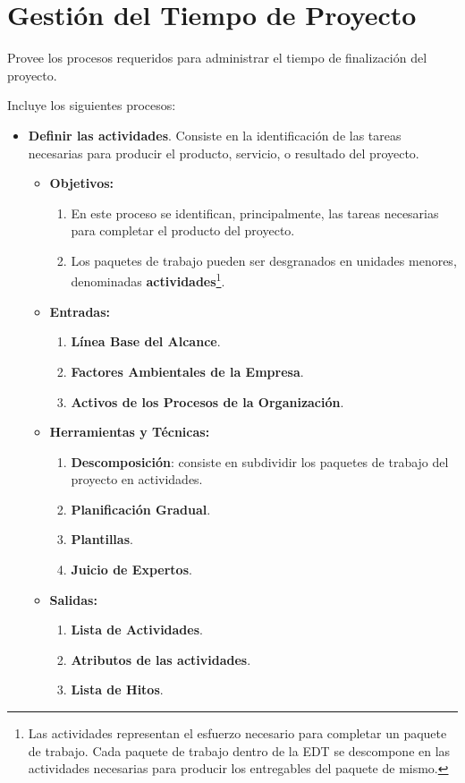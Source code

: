 \documentclass[10pt,a4paper]{article}
\begin{document}
\section{Gestión del Tiempo de Proyecto}
Provee los procesos requeridos para administrar el tiempo de finalización del proyecto.

Incluye los siguientes procesos:
\begin{itemize}
\item \textbf{Definir las actividades}. 
Consiste en la identificación de las tareas necesarias para producir el producto, servicio, o resultado del proyecto.

\begin{itemize}
\item \textbf{Objetivos:}
\begin{enumerate}
\item En este proceso se identifican, principalmente, las tareas necesarias para
completar el producto del proyecto.
\item Los paquetes de trabajo pueden ser desgranados en unidades menores, denominadas \textbf{actividades}\footnote{Las actividades representan el esfuerzo necesario para completar un paquete de trabajo. Cada paquete de trabajo dentro de la EDT se descompone en las actividades necesarias para producir los entregables del paquete de mismo.}.
\end{enumerate}

\item \textbf{Entradas:}
\begin{enumerate}
\item \textbf{Línea Base del Alcance}.
\item \textbf{Factores Ambientales de la Empresa}.
\item \textbf{Activos de los Procesos de la Organización}.
\end{enumerate}

\item \textbf{Herramientas y Técnicas:}
\begin{enumerate}
\item \textbf{Descomposición}: consiste en subdividir los paquetes de trabajo del proyecto en actividades.
\item \textbf{Planificación Gradual}.
\item \textbf{Plantillas}.
\item \textbf{Juicio de Expertos}.
\end{enumerate}

\item \textbf{Salidas:}
\begin{enumerate}
\item \textbf{Lista de Actividades}.
\item \textbf{Atributos de las actividades}.
\item \textbf{Lista de Hitos}.
\end{enumerate}
\end{itemize}


\end{itemize}
\end{document}
